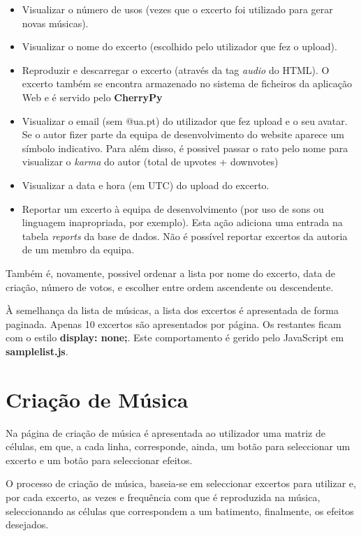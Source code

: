 \documentclass{report}
\begin{document}
\begin{itemize}
  \item Visualizar o número de usos (vezes que o excerto foi utilizado para gerar novas músicas).
  \item Visualizar o nome do excerto (escolhido pelo utilizador que fez o upload).
  \item Reproduzir e descarregar o excerto (através da tag \textit{audio} do HTML). O excerto também se encontra armazenado no sistema de ficheiros da aplicação Web e é servido pelo \textbf{CherryPy}
  \item Visualizar o email (sem @ua.pt) do utilizador que fez upload e o seu avatar. Se o autor fizer parte da equipa de desenvolvimento do website aparece um símbolo indicativo. Para além disso, é possivel passar o rato pelo nome para visualizar o \textit{karma} do autor (total de upvotes + downvotes)
  \item Visualizar a data e hora (em UTC) do upload do excerto.
  \item Reportar um excerto à equipa de desenvolvimento (por uso de sons ou linguagem inapropriada, por exemplo). Esta ação adiciona uma entrada na tabela \textit{reports} da base de dados. Não é possível reportar excertos da autoria de um membro da equipa.\\
\end{itemize}

Também é, novamente, possivel ordenar a lista por nome do excerto, data de criação, número de votos, e escolher entre ordem ascendente ou descendente.

À semelhança da lista de músicas, a lista dos excertos é apresentada de forma paginada. Apenas 10 excertos são apresentados por página. Os restantes ficam com o estilo \textbf{display: none;}. Este comportamento é gerido pelo JavaScript em \textbf{samplelist.js}.


\section{Criação de Música}
\label{sec.create}

Na página de criação de música é apresentada ao utilizador uma matriz de células, em que, a cada linha, corresponde, ainda, um botão para seleccionar um excerto e um botão para seleccionar efeitos.

O processo de criação de música, baseia-se em seleccionar excertos para utilizar e, por cada excerto, as vezes e frequência com que é reproduzida na música, seleccionando as células que correspondem a um batimento, finalmente, os efeitos  desejados. 
\end{document}
